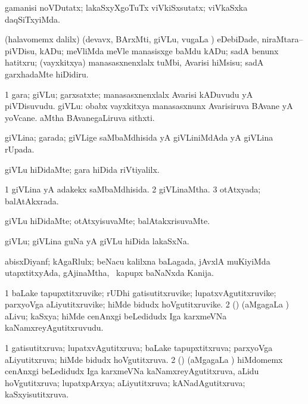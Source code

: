 \bentry
{}
\gl{\kirxvi}
\bmng
gamanisi noVDutatx; lakaSxyXgoTuTx viVkiSxsutatx; viVkaSxka daqSiTxyiMda. 
\emng
\eentry

\bentry
{}
\gl{\sakirx}
\bmng
(halavomemx \kaparx dalilx) (devavx, BArxMti, giVLu, \mo vugaLa \vi) eDebiDade, niraMtara--piVDisu, kADu; meVliMda meVle manasisxge baMdu kADu; sadA benunx hatitxru; (vayxkitxya) manasasxnenxlalx tuMbi, Avarisi hiMsisu; sadA garxhadaMte hiDidiru. 
\emng
\eentry

\bentry
{}
\gl{\nA}
\bmng
\bnum
\num{1} gara; giVLu; garxsatxte; manasasxnenxlalx Avarisi kADuvudu yA piVDisuvudu. 
 giVLu: 
\banum
{} obabx vayxkitxya manasasxnunx Avarisiruva BAvane yA yoVcane. 
 aMtha BAvanegaLiruva sithxti. 
\eanum
\numie
\enum
\emng
\eentry

\bentry
{}
\gl{\gu}
\bmng
giVLina; garada; giVLige saMbaMdhisida yA giVLiniMdAda yA giVLina rUpada. 
\emng
\eentry

\bentry
{}
\gl{\kirxvi}
\bmng
giVLu hiDidaMte; gara hiDida riVtiyalilx. 
\emng
\eentry

\bentry
{}
\gl{\gu}
\bmng
\bnum
\num{1} giVLina yA adakekx saMbaMdhisida. 
\num{2} giVLinaMtha. 
\num{3} otAtxyada; balAtAkxrada. 
\enum
\emng
\eentry

\bentry
{}
\gl{\kirxvi}
\bmng
giVLu hiDidaMte; otAtxyisuvaMte; balAtakxrisuvaMte. 
\emng
\eentry

\bentry
{}
\gl{\nA}
\bmng
giVLu; giVLina guNa yA giVLu hiDida lakaSxNa. 
\emng
\eentry

\bentry
{}
\gl{\nA}
\bmng
abisxDiyanf; kAgaRlulx; beNacu kalilxna baLagada, jAvxlA muKiyiMda utapxtitxyAda, gAjinaMtha, \sA\ kapupx baNaNxda Kanija. 
\emng
\eentry

\bentry
{}
\gl{\nA}
\bmng
\bnum
\num{1} baLake tapupxtitxruvike; rUDhi gatisutitxruvike; lupatxvAgutitxruvike; parxyoVga aLiyutitxruvike; hiMde bidudx hoVgutitxruvike. 
\num{2} (\jiVvi) (aMgagaLa \vi) aLivu; kaSxya; hiMde cenAnxgi beLedidudx Iga karxmeVNa kaNamxreyAgutitxruvudu. 
\enum
\emng
\eentry

\bentry
{}
\gl{\gu}
\bmng
\bnum
\num{1} gatisutitxruva; lupatxvAgutitxruva; baLake tapupxtitxruva; parxyoVga aLiyutitxruva; hiMde bidudx hoVgutitxruva. 
\num{2} (\jiVvi) (aMgagaLa \vi) hiMdomemx cenAnxgi beLedidudx Iga karxmeVNa kaNamxreyAgutitxruva, aLidu hoVgutitxruva; lupatxpArxya; aLiyutitxruva; kANadAgutitxruva; kaSxyisutitxruva. 
\enum
\emng
\eentry

